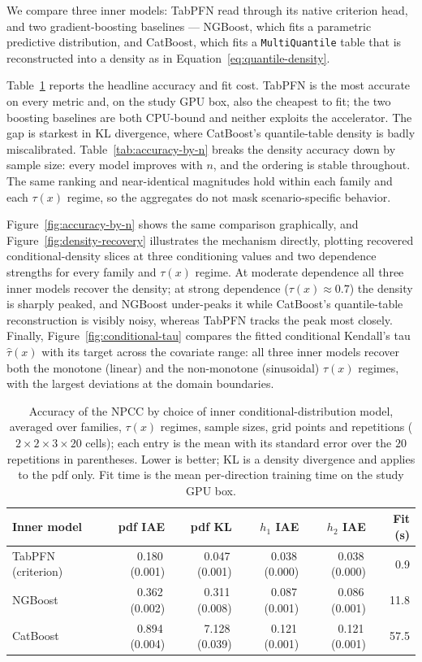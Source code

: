 \documentclass[11pt]{article}
\begin{document}
We compare three inner models: TabPFN read through its native criterion
head, and two gradient-boosting baselines --- NGBoost, which fits a
parametric predictive distribution, and CatBoost, which fits a
\texttt{MultiQuantile} table that is reconstructed into a density as in
Equation~\eqref{eq:quantile-density}.

Table~\ref{tab:inner-model-accuracy} reports the headline accuracy and
fit cost. TabPFN is the most accurate on every metric and, on the study
GPU box, also the cheapest to fit; the two boosting baselines are both
CPU-bound and neither exploits the accelerator. The gap is starkest in
KL divergence, where CatBoost's quantile-table density is badly
miscalibrated. Table~\ref{tab:accuracy-by-n} breaks the density accuracy
down by sample size: every model improves with $n$, and the ordering is
stable throughout. The same ranking and near-identical magnitudes hold
within each family and each $\tau(x)$ regime, so the aggregates do not mask
scenario-specific behavior.

Figure~\ref{fig:accuracy-by-n} shows the same comparison graphically, and
Figure~\ref{fig:density-recovery} illustrates the mechanism directly,
plotting recovered conditional-density slices at three conditioning values
and two dependence strengths for every family and $\tau(x)$ regime. At
moderate dependence all three inner models recover the density; at strong
dependence ($\tau(x) \approx 0.7$) the density is sharply peaked, and
NGBoost under-peaks it while CatBoost's quantile-table reconstruction is
visibly noisy, whereas TabPFN tracks the peak most closely. Finally,
Figure~\ref{fig:conditional-tau} compares the fitted conditional Kendall's
tau $\widehat\tau(x)$ with its target across the covariate range: all three
inner models recover both the monotone (linear) and the non-monotone
(sinusoidal) $\tau(x)$ regimes, with the largest deviations at the domain
boundaries.

\begin{table}[h]
  \centering
  \begin{tabular}{lrrrrr}
    \toprule
    Inner model & pdf IAE & pdf KL & $h_1$ IAE & $h_2$ IAE & Fit (s) \\
    \midrule
    TabPFN (criterion) & 0.180\,(0.001) & 0.047\,(0.001) & 0.038\,(0.000) & 0.038\,(0.000) & 0.9 \\
    NGBoost & 0.362\,(0.002) & 0.311\,(0.008) & 0.087\,(0.001) & 0.086\,(0.001) & 11.8 \\
    CatBoost & 0.894\,(0.004) & 7.128\,(0.039) & 0.121\,(0.001) & 0.121\,(0.001) & 57.5 \\
    \bottomrule
  \end{tabular}
  \caption{Accuracy of the NPCC by choice of inner conditional-distribution
  model, averaged over families, $\tau(x)$ regimes, sample sizes, grid points
  and repetitions ($2\times2\times3\times20$ cells); each entry is the mean
  with its standard error over the $20$ repetitions in parentheses. Lower is
  better; KL is a density divergence and applies to the pdf only. Fit time is
  the mean per-direction training time on the study GPU box.}
  \label{tab:inner-model-accuracy}
\end{table}
\end{document}
